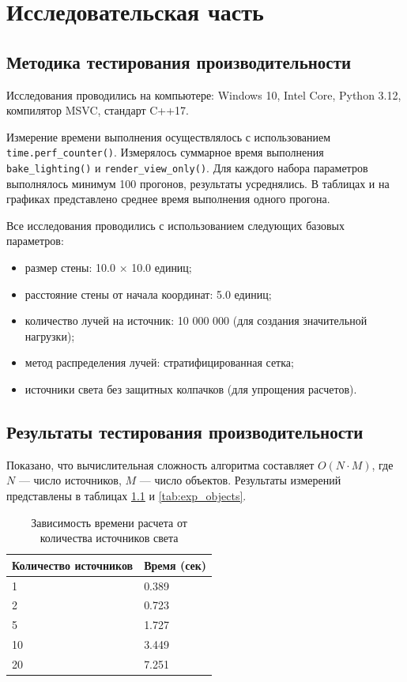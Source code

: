 \chapter{Исследовательская часть}

\section{Методика тестирования производительности}

Исследования проводились на компьютере: Windows 10, Intel Core, Python 3.12, компилятор MSVC, стандарт C++17.

Измерение времени выполнения осуществлялось с использованием \texttt{time.perf\_counter()}. Измерялось суммарное время выполнения \texttt{bake\_lighting()} и \texttt{render\_view\_only()}. Для каждого набора параметров выполнялось минимум 100 прогонов, результаты усреднялись. В таблицах и на графиках представлено среднее время выполнения одного прогона.

Все исследования проводились с использованием следующих базовых параметров:
\begin{itemize}
    \item размер стены: 10.0 × 10.0 единиц;
    \item расстояние стены от начала координат: 5.0 единиц;
    \item количество лучей на источник: 10 000 000 (для создания значительной нагрузки);
    \item метод распределения лучей: стратифицированная сетка;
    \item источники света без защитных колпачков (для упрощения расчетов).
\end{itemize}

\section{Результаты тестирования производительности}

Показано, что вычислительная сложность алгоритма составляет $O(N \cdot M)$, где $N$ --- число источников, $M$ --- число объектов. Результаты измерений представлены в таблицах \ref{tab:exp_lights} и \ref{tab:exp_objects}.

\begin{table}[H]
\centering
\caption{Зависимость времени расчета от количества источников света}
\label{tab:exp_lights}
\renewcommand{\arraystretch}{1.3}
\begin{tabular}{|m{4cm}|m{4cm}|}
\hline
\textbf{Количество источников} & \textbf{Время (сек)} \\
\hline
1 & 0.389 \\
\hline
2 & 0.723 \\
\hline
5 & 1.727 \\
\hline
10 & 3.449 \\
\hline
20 & 7.251 \\
\hline
\end{tabular}
\end{table}

